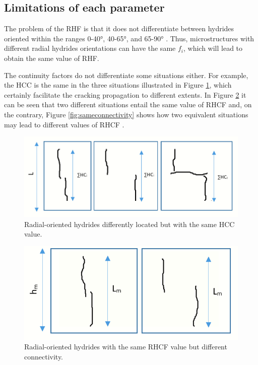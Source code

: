 \subsection{Limitations of each parameter}

\noindent
The problem of the RHF is that it does not differentiate between hydrides oriented within the ranges 0-40°, 40-65°, and 65-90° \cite{SIMON2021152817}. Thus, microstructures with different radial hydrides orientations can have the same $f_i$, which will lead to obtain the same value of RHF.

\noindent
The continuity factors do not differentiate some situations either. For example, the HCC is the same in the three situations illustrated in Figure \ref{fig:limitationhcc}, which certainly facilitate the cracking propagation to different extents. In Figure \ref{fig:limitationrhcf} it can be seen that two different situations entail the same value of RHCF and, on the contrary, Figure \ref{fig:sameconnectivity} shows how two equivalent situations may lead to different values of RHCF \cite{SIMON2021152817}.

\begin{figure}[h] %
    \centering
    \includegraphics[width=4.5in]{Figures/3-Limitations/HCC comparison.png}
    \caption{Radial-oriented hydrides differently located but with the same HCC value.}
    \label{fig:limitationhcc}
\end{figure}

\begin{figure}[h] %
    \centering
    \includegraphics[width=4.5in]{Figures/3-Limitations/RHCF comparison 1.png}
    \caption{Radial-oriented hydrides with the same RHCF value but different connectivity.}
    \label{fig:limitationrhcf}
\end{figure}

